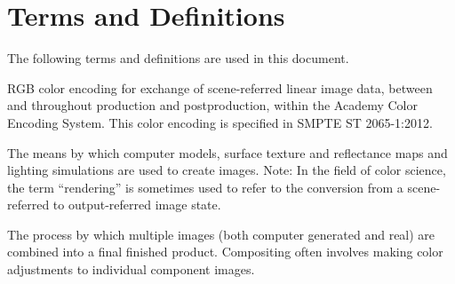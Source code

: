 \numberedformat
\chapter{Terms and Definitions}
The following terms and definitions are used in this document.

RGB color encoding for exchange of scene-referred linear image data, between and throughout production and postproduction, within the Academy Color Encoding System. This color encoding is specified in SMPTE ST 2065-1:2012. 

The means by which computer models, surface texture and reflectance maps and lighting simulations are used to create images.  Note: In the field of color science, the term ``rendering'' is sometimes used to refer to the conversion from a scene-referred to output-referred image state.

The process by which multiple images (both computer generated and real) are combined into a final finished product.  Compositing often involves making color adjustments to individual component images.